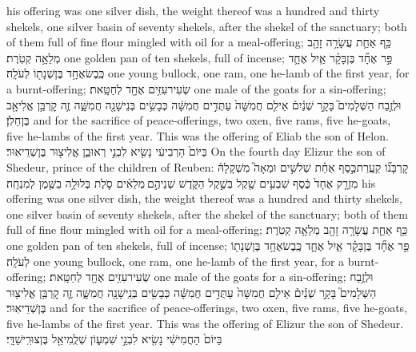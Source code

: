 \documentclass[11pt, openany]{book}
\begin{document}
{his offering was one silver dish, the weight thereof was a hundred and thirty shekels, one silver basin of seventy shekels, after the shekel of the sanctuary; both of them full of fine flour mingled with oil for a meal-offering;}
{כַּ֥ף אַחַ֛ת עֲשָׂרָ֥ה זָהָ֖ב מְלֵאָ֥ה קְטֹֽרֶת׃}
{one golden pan of ten shekels, full of incense;}
{פַּ֣ר אֶחָ֞ד בֶּן\maqqaf בָּקָ֗ר אַ֧יִל אֶחָ֛ד כֶּֽבֶשׂ\maqqaf אֶחָ֥ד בֶּן\maqqaf שְׁנָת֖וֹ לְעֹלָֽה׃}
{one young bullock, one ram, one he-lamb of the first year, for a burnt-offering;}
{שְׂעִיר\maqqaf עִזִּ֥ים אֶחָ֖ד לְחַטָּֽאת׃}
{one male of the goats for a sin-offering;}
{וּלְזֶ֣בַח הַשְּׁלָמִים֮ בָּקָ֣ר שְׁנַ֒יִם֒ אֵילִ֤ם חֲמִשָּׁה֙ עַתֻּדִ֣ים חֲמִשָּׁ֔ה כְּבָשִׂ֥ים בְּנֵי\maqqaf שָׁנָ֖ה חֲמִשָּׁ֑ה זֶ֛ה קׇרְבַּ֥ן אֱלִיאָ֖ב בֶּן\maqqaf חֵלֹֽן׃ \petucha }
{and for the sacrifice of peace-offerings, two oxen, five rams, five he-goats, five he-lambs of the first year. This was the offering of Eliab the son of Helon.}
{בַּיּוֹם֙ הָרְבִיעִ֔י נָשִׂ֖יא לִבְנֵ֣י רְאוּבֵ֑ן אֱלִיצ֖וּר בֶּן\maqqaf שְׁדֵיאֽוּר׃}
{On the fourth day Elizur the son of Shedeur, prince of the children of Reuben:}
{קׇרְבָּנ֞וֹ קַֽעֲרַת\maqqaf כֶּ֣סֶף אַחַ֗ת שְׁלֹשִׁ֣ים וּמֵאָה֮ מִשְׁקָלָהּ֒ מִזְרָ֤ק אֶחָד֙ כֶּ֔סֶף שִׁבְעִ֥ים שֶׁ֖קֶל בְּשֶׁ֣קֶל הַקֹּ֑דֶשׁ שְׁנֵיהֶ֣ם \legarmeh  מְלֵאִ֗ים סֹ֛לֶת בְּלוּלָ֥ה בַשֶּׁ֖מֶן לְמִנְחָֽה׃}
{his offering was one silver dish, the weight thereof was a hundred and thirty shekels, one silver basin of seventy shekels, after the shekel of the sanctuary; both of them full of fine flour mingled with oil for a meal-offering;}
{כַּ֥ף אַחַ֛ת עֲשָׂרָ֥ה זָהָ֖ב מְלֵאָ֥ה קְטֹֽרֶת׃}
{one golden pan of ten shekels, full of incense;}
{פַּ֣ר אֶחָ֞ד בֶּן\maqqaf בָּקָ֗ר אַ֧יִל אֶחָ֛ד כֶּֽבֶשׂ\maqqaf אֶחָ֥ד בֶּן\maqqaf שְׁנָת֖וֹ לְעֹלָֽה׃}
{one young bullock, one ram, one he-lamb of the first year, for a burnt-offering;}
{שְׂעִיר\maqqaf עִזִּ֥ים אֶחָ֖ד לְחַטָּֽאת׃}
{one male of the goats for a sin-offering;}
{וּלְזֶ֣בַח הַשְּׁלָמִים֮ בָּקָ֣ר שְׁנַ֒יִם֒ אֵילִ֤ם חֲמִשָּׁה֙ עַתֻּדִ֣ים חֲמִשָּׁ֔ה כְּבָשִׂ֥ים בְּנֵֽי\maqqaf שָׁנָ֖ה חֲמִשָּׁ֑ה זֶ֛ה קׇרְבַּ֥ן אֱלִיצ֖וּר בֶּן\maqqaf שְׁדֵיאֽוּר׃ \petucha }
{and for the sacrifice of peace-offerings, two oxen, five rams, five he-goats, five he-lambs of the first year. This was the offering of Elizur the son of Shedeur.}
{בַּיּוֹם֙ הַחֲמִישִׁ֔י נָשִׂ֖יא לִבְנֵ֣י שִׁמְע֑וֹן שְׁלֻֽמִיאֵ֖ל בֶּן\maqqaf צוּרִֽישַׁדָּֽי׃}
\end{document}
